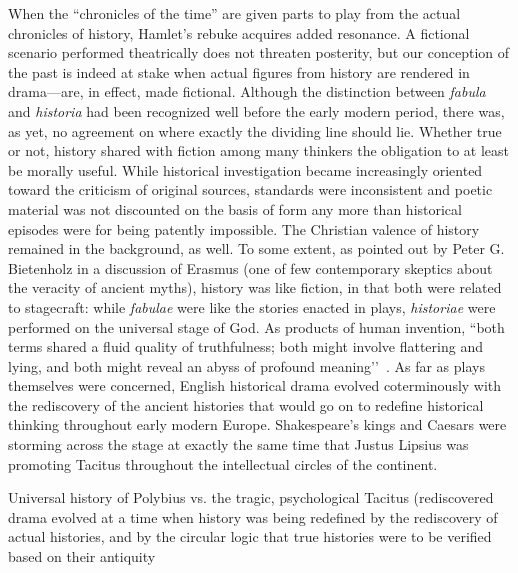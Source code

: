 When the ``chronicles of the time'' are given parts to play from the actual chronicles of history, Hamlet's rebuke acquires added resonance. A fictional scenario performed theatrically does not threaten posterity, but our conception of the past is indeed at stake when actual figures from history are rendered in drama---are, in effect, made fictional. Although the distinction between \emph{fabula} and \emph{historia} had been recognized well before the early modern period, there was, as yet, no agreement on where exactly the dividing line should lie. Whether true or not, history shared with fiction among many thinkers the obligation to at least be morally useful. While historical investigation became increasingly oriented toward the criticism of original sources, standards were inconsistent and poetic material was not discounted on the basis of form any more than historical episodes were for being patently impossible. The Christian valence of history remained in the background, as well. To some extent, as pointed out by Peter G. Bietenholz in a discussion of Erasmus (one of few contemporary skeptics about the veracity of ancient myths), history was like fiction, in that both were related to stagecraft: while \emph{fabulae} were like the stories enacted in plays, \emph{historiae} were performed on the universal stage of God. As products of human invention, ``both terms shared a fluid quality of truthfulness; both might involve flattering and lying, and both might reveal an abyss of profound meaning’’~\cite[148]{Bietenholz}. As far as plays themselves were concerned, English historical drama evolved coterminously with the rediscovery of the ancient histories that would go on to redefine historical thinking throughout early modern Europe. Shakespeare’s kings and Caesars were storming across the stage at exactly the same time that Justus Lipsius was promoting Tacitus throughout the intellectual circles of the continent. 

Universal history of Polybius vs. the tragic, psychological Tacitus (rediscovered 
drama evolved at a time when history was being redefined by the rediscovery of actual histories, and by the circular logic that true histories were to be verified based on their antiquity

